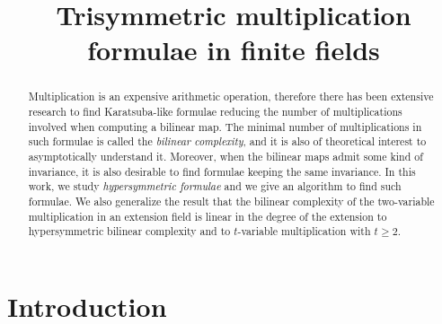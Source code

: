 \documentclass[11pt]{article}
\title{Trisymmetric multiplication formulae in finite fields}
\author{}
\begin{document}
\maketitle

\begin{abstract}
  Multiplication is an expensive arithmetic operation, therefore there has been
  extensive research to find Karatsuba-like formulae reducing the number of
  multiplications involved when computing a bilinear map. The minimal number of
  multiplications in such formulae is called the \emph{bilinear complexity}, and
  it is also of theoretical interest to asymptotically understand it. Moreover,
  when the bilinear maps admit some kind of invariance, it is also desirable to
  find formulae keeping the same invariance. In this work, we study
  \emph{hypersymmetric formulae} and we give an algorithm to find such formulae.
  We also generalize the result that the bilinear complexity of the
  two-variable multiplication in an extension field is linear in the degree of
  the extension to hypersymmetric bilinear complexity and to $t$-variable
  multiplication with $t\geq2$.
\end{abstract}


\section{Introduction}
\label{sec:intro}
\end{document}
